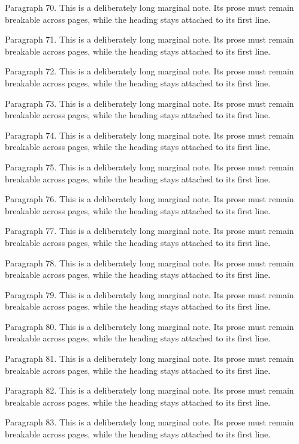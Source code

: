 \documentclass[11pt]{article}
\begin{document}
{Paragraph 70. This is a deliberately long marginal note. Its prose must remain breakable across pages, while the heading stays attached to its first line.\par
Paragraph 71. This is a deliberately long marginal note. Its prose must remain breakable across pages, while the heading stays attached to its first line.\par
Paragraph 72. This is a deliberately long marginal note. Its prose must remain breakable across pages, while the heading stays attached to its first line.\par
Paragraph 73. This is a deliberately long marginal note. Its prose must remain breakable across pages, while the heading stays attached to its first line.\par
Paragraph 74. This is a deliberately long marginal note. Its prose must remain breakable across pages, while the heading stays attached to its first line.\par
Paragraph 75. This is a deliberately long marginal note. Its prose must remain breakable across pages, while the heading stays attached to its first line.\par
Paragraph 76. This is a deliberately long marginal note. Its prose must remain breakable across pages, while the heading stays attached to its first line.\par
Paragraph 77. This is a deliberately long marginal note. Its prose must remain breakable across pages, while the heading stays attached to its first line.\par
Paragraph 78. This is a deliberately long marginal note. Its prose must remain breakable across pages, while the heading stays attached to its first line.\par
Paragraph 79. This is a deliberately long marginal note. Its prose must remain breakable across pages, while the heading stays attached to its first line.\par
Paragraph 80. This is a deliberately long marginal note. Its prose must remain breakable across pages, while the heading stays attached to its first line.\par
Paragraph 81. This is a deliberately long marginal note. Its prose must remain breakable across pages, while the heading stays attached to its first line.\par
Paragraph 82. This is a deliberately long marginal note. Its prose must remain breakable across pages, while the heading stays attached to its first line.\par
Paragraph 83. This is a deliberately long marginal note. Its prose must remain breakable across pages, while the heading stays attached to its first line.\par
}
\end{document}
